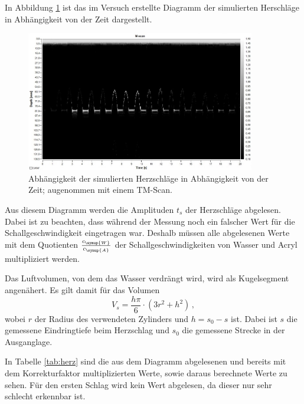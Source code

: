 In Abbildung \ref{fig:herzvolumen} ist das im Versuch erstellte Diagramm der
simulierten Herschläge in Abhängigkeit von der Zeit dargestellt.

\begin{figure}[H]
  \centering
  \includegraphics[width=10cm]{data/Herzfrequenz.jpg}
  \caption{Abhängigkeit der simulierten Herzschläge in Abhängigkeit von der Zeit; augenommen
  mit einem TM-Scan.}
  \label{fig:herzvolumen}
\end{figure}

Aus diesem Diagramm werden die Amplituden $t_s$ der Herzschläge abgelesen. Dabei
ist zu beachten, dass während der Messung noch ein falscher Wert für die Schallgeschwindigkeit
eingetragen war. Deshalb müssen alle abgelesenen Werte mit dem Quotienten
$\frac{c_{\symup{W}}}{c_{\symup{A}}}$ der Schallgeschwindigkeiten von Wasser
und Acryl multipliziert werden.

Das Luftvolumen, von dem das Wasser verdrängt wird, wird als Kugelsegment angenähert.
Es gilt damit für das Volumen
\begin{equation}
  V_s = \frac{h\pi}{6}\cdot(3r^2 + h^2) \,,
\end{equation}
wobei $r$ der Radius des verwendeten Zylinders und $h=s_0-s$ ist. Dabei ist $s$
die gemessene Eindringtiefe beim Herzschlag und $s_0$ die gemessene Strecke in
der Ausganglage.

In Tabelle \ref{tab:herz} sind die aus dem Diagramm abgelesenen und bereits mit dem
Korrekturfaktor multiplizierten Werte, sowie daraus berechnete Werte zu sehen. Für den
ersten Schlag wird kein Wert abgelesen, da dieser nur sehr schlecht erkennbar ist.

